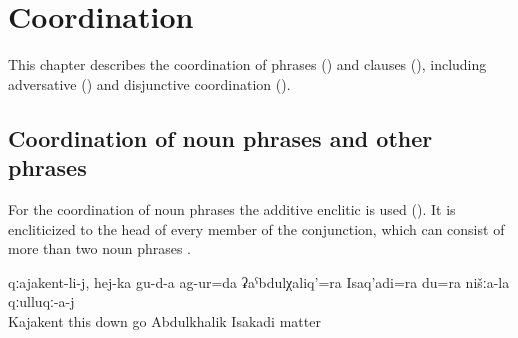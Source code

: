 \chapter{Coordination}
\label{cpt:Coordination}

This chapter describes the coordination of phrases () and clauses (), including adversative () and disjunctive coordination ().

\section{Coordination of noun phrases and other phrases}
\label{sec:Coordination of noun phrases and other phrases}

For the coordination of noun phrases the additive enclitic  is used (). It is encliticized to the head of every member of the conjunction, which can consist of more than two noun phrases .
%
\begin{exe}
	\ex	\label{ex:‎‎‎To Kajakent, from here up downwards we travelled, Abdukhalik, Isakadi and me, for our matters}
	\gll	qːajakent-li-j,	hej-ka	gu-d-a	ag-ur=da	ʡaˁbdulχaliq'=ra	Isaq'adi=ra	du=ra	nišːa-la	qːulluqː-a-j\\
		Kajakent	this	down	go	Abdulkhalik\tsc{=add} Isakadi			matter\\
	\glt	{}
\end{exe}

